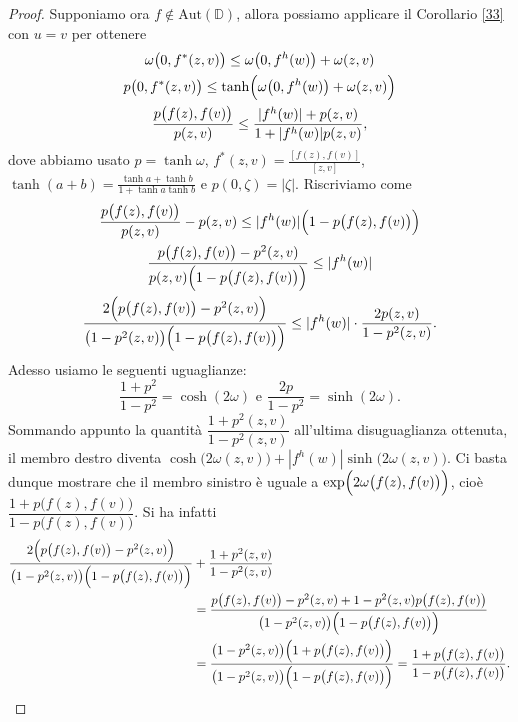 \begin{proof}
  Supponiamo ora $f \not\in \text{Aut}(\mathbb{D})$, allora possiamo applicare il Corollario \ref{33} con $u=v$ per ottenere
  \begin{gather*}
    \omega\bigl(0,f^*(z,v)\bigr) \le \omega\bigl(0,f^h(w)\bigr)+\omega(z,v) \\
    p\bigl(0,f^*(z,v)\bigr) \le \tanh\Bigl(\omega\bigl(0,f^h(w)\bigr)+\omega(z,v)\Bigr) \\
    \frac{p\bigl(f(z),f(v)\bigr)}{p(z,v)} \le \frac{|f^h(w)|+p(z,v)}{1+|f^h(w)|p(z,v)},
  \end{gather*}
  dove abbiamo usato $p=\tanh\omega$, $f^*(z,v)=\frac{[f(z),f(v)]}{[z,v]}$, $\tanh(a+b)=\frac{\tanh{a}+\tanh{b}}{1+\tanh{a}\tanh{b}}$ e $p(0,\zeta)=|\zeta|$. Riscriviamo come
  \begin{gather*}
    \frac{p\bigl(f(z),f(v)\bigr)}{p(z,v)}-p(z,v) \le |f^h(w)|\Bigl(1-p\bigl(f(z),f(v)\bigr)\Bigr) \\
    \frac{p\bigl(f(z),f(v)\bigr)-p^2(z,v)}{p(z,v)\Bigl(1-p\bigl(f(z),f(v)\bigr)\Bigr)} \le |f^h(w)| \\
    \frac{2\Bigl(p\bigl(f(z),f(v)\bigr)-p^2(z,v)\Bigr)}{\bigl(1-p^2(z,v)\bigr)\Bigl(1-p\bigl(f(z),f(v)\bigr)\Bigr)} \le |f^h(w)|\cdot \frac{2p(z,v)}{1-p^2(z,v)}.
  \end{gather*}
  Adesso usiamo le seguenti uguaglianze:
  $$\frac{1+p^2}{1-p^2}=\cosh(2\omega) \text{ e } \frac{2p}{1-p^2}=\sinh(2\omega).$$
  Sommando appunto la quantità $\dfrac{1+p^2(z,v)}{1-p^2(z,v)}$ all'ultima disuguaglianza ottenuta, il membro destro diventa $\cosh\bigl(2\omega(z,v)\bigr)+|f^h(w)|\sinh\bigl(2\omega(z,v)\bigr)$. Ci basta dunque mostrare che il membro sinistro è uguale a $\exp\Bigl(2\omega\bigl(f(z),f(v)\bigr)\Bigr)$, cioè $\dfrac{1+p\bigl(f(z),f(v)\bigr)}{1-p\bigl(f(z),f(v)\bigr)}$. Si ha infatti
  \begin{align*}
    \frac{2\Bigl(p\bigl(f(z),f(v)\bigr)-p^2(z,v)\Bigr)}{\bigl(1-p^2(z,v)\bigr)\Bigl(1-p\bigl(f(z),f(v)\bigr)\Bigr)}&+\frac{1+p^2(z,v)}{1-p^2(z,v)} \\
    & = \frac{p\bigl(f(z),f(v)\bigr)-p^2(z,v)+1-p^2(z,v)p\bigl(f(z),f(v)\bigr)}{\bigl(1-p^2(z,v)\bigr)\Bigl(1-p\bigl(f(z),f(v)\bigr)\Bigr)} \\
    & = \frac{\bigl(1-p^2(z,v)\bigr)\Bigl(1+p\bigl(f(z),f(v)\bigr)\Bigr)}{\bigl(1-p^2(z,v)\bigr)\Bigl(1-p\bigl(f(z),f(v)\bigr)\Bigr)}=\frac{1+p\bigl(f(z),f(v)\bigr)}{1-p\bigl(f(z),f(v)\bigr)}.
  \end{align*}
\end{proof}

